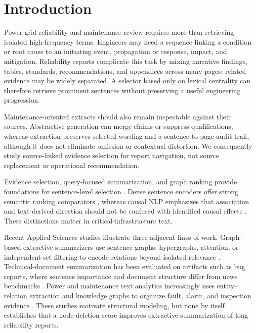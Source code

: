 \documentclass[applsci,article,submit,moreauthors]{Definitions/mdpi}
\begin{document}
\section{Introduction}

Power-grid reliability and maintenance review requires more than retrieving isolated high-frequency terms. Engineers may need a sequence linking a condition or root cause to an initiating event, propagation or response, impact, and mitigation. Reliability reports complicate this task by mixing narrative findings, tables, standards, recommendations, and appendices across many pages; related evidence may be widely separated. A selector based only on lexical centrality can therefore retrieve prominent sentences without preserving a useful engineering progression.

Maintenance-oriented extracts should also remain inspectable against their sources. Abstractive generation can merge claims or suppress qualifications, whereas extraction preserves selected wording and a sentence-to-page audit trail, although it does not eliminate omission or contextual distortion. We consequently study source-linked evidence selection for report navigation, not source replacement or operational recommendation.

Evidence selection, query-focused summarization, and graph ranking provide foundations for sentence-level selection \cite{thorne2018fever,zhong2021qmsum,vig2022exploring,wang2020heterogeneous}. Dense sentence encoders offer strong semantic ranking comparators \cite{reimers2019sentencebert}, whereas causal NLP emphasizes that association and text-derived direction should not be confused with identified causal effects \cite{feder2022causal,du2022ecare}. These distinctions matter in critical-infrastructure text.

Recent Applied Sciences studies illustrate three adjacent lines of work. Graph-based extractive summarizers use sentence graphs, hypergraphs, attention, or independent-set filtering to encode relations beyond isolated relevance \cite{siragusa2022sentencegraph,onan2024mches,hark2025mis}. Technical-document summarization has been evaluated on artifacts such as bug reports, where sentence importance and document structure differ from news benchmarks \cite{koh2022bugreport}. Power and maintenance text analytics increasingly uses entity--relation extraction and knowledge graphs to organize fault, alarm, and inspection evidence \cite{liu2022powerfault,ma2025alarm,zgg2026bridge}. These studies motivate structural modeling, but none by itself establishes that a node-deletion score improves extractive summarization of long reliability reports.
\end{document}
